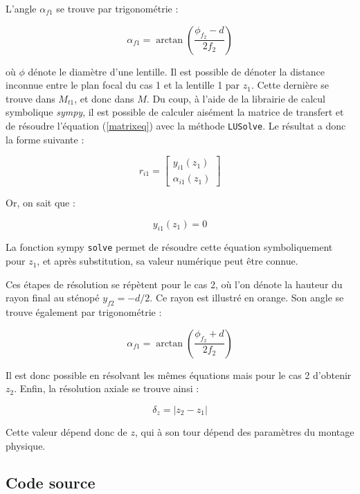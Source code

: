 \documentclass[11pt,letterpaper]{article}
\begin{document}
L'angle $\alpha_{f1}$ se trouve par trigonométrie :

\begin{equation}
  \alpha_{f1}= \arctan\left( \frac{\phi_{f_{2}}-d}{2f_{2}} \right)
\end{equation}

où $\phi$ dénote le diamètre d'une lentille. Il est possible de dénoter la distance inconnue entre le plan focal du cas 1 et la lentille 1 par $z_{1}$. Cette dernière se trouve dans $M_{t1}$, et donc dans $M$. Du coup, à l'aide de la librairie de calcul symbolique \textit{sympy}, il est possible de calculer aisément la matrice de transfert et de résoudre l'équation (\ref{matrixeq}) avec la méthode \texttt{LUSolve}. Le résultat a donc la forme suivante :

\begin{equation}
  r_{i1}= \begin{bmatrix}
   y_{i1}(z_{1})  \\
    \alpha_{i1}(z_{1})
  \end{bmatrix}
\end{equation}

Or, on sait que :

\begin{equation}
  y_{i1}(z_{1})=0
\end{equation}

La fonction sympy \texttt{solve} permet de résoudre cette équation symboliquement pour $z_{1}$, et après substitution, sa valeur numérique peut être connue.

Ces étapes de résolution se répètent pour le cas 2, où l'on dénote la hauteur du rayon final au sténopé $y_{f2} = -d/2$. Ce rayon est illustré en orange. Son angle se trouve également par trigonométrie :

\begin{equation}
  \alpha_{f1}= \arctan\left( \frac{\phi_{f_{2}}+d}{2f_{2}} \right)
\end{equation}

Il est donc possible en résolvant les mêmes équations mais pour le cas 2 d'obtenir $z_{2}$. Enfin, la résolution axiale se trouve ainsi :

\begin{equation}
  \delta_{z}= |z_{2}-z_{1}|
\end{equation}

Cette valeur dépend donc de $z$, qui à son tour dépend des paramètres du montage physique.

\subsection{Code source}
\end{document}
